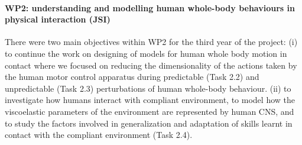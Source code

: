 \paragraph{WP2: understanding and modelling human whole-body behaviours in physical interaction (JSI)}

There were two main objectives within WP2 for the third year of the project: (i) to continue the work on designing of models for human whole body motion in contact where we focused on reducing the dimensionality of the actions taken by the human motor control apparatus during predictable (Task 2.2) and unpredictable (Task 2.3) perturbations of human whole-body behaviour. (ii) to investigate how humans interact with compliant environment, to model how the viscoelastic parameters of the environment are represented by human CNS, and to study the factors involved in generalization and adaptation of skills learnt in contact with the compliant environment (Task 2.4).
